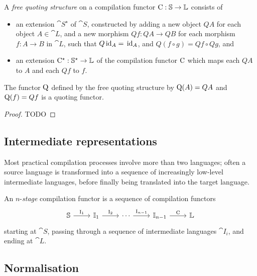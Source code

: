 \begin{definition}
  A \emph{free quoting structure} on a compilation functor $\mathrm C : \mathbb S
    \to \mathbb L$ consists of
  \begin{itemize}
    \item an extension $\cat S^\star$ of $\cat S$, constructed by adding a new object $Q
            A$ for each object $A \in \cat L$, and a new morphism $Q f : Q A \to Q B$ for
          each morphism $f : A \to B$ in $\cat L$, such that $Q \, \text{id}_A = \,
            \text{id}_A$, and $Q (f \circ g) = Q f \circ Q g$, and
    \item an extension $\mathrm C^\star : \mathbb S^\star \to \mathbb L$ of the compilation
          functor $\mathrm C$ which maps each $Q A$ to $A$ and each $Q f$ to $f$.
  \end{itemize}
\end{definition}

\begin{lemma}
  The functor $\mathrm Q$ defined by the free quoting structure
  by $\mathrm Q (A) = Q A$ and $\mathrm Q (f) = Q f$ is a quoting functor.

  \begin{proof}
    TODO
  \end{proof}
\end{lemma}

\subsection{Intermediate representations}

Most practical compilation processes involve more than two languages; often a
source language is transformed into a sequence of increasingly low-level
intermediate languages, before finally being translated into the target
language.

\begin{definition}
  An $n$-\emph{stage} compilation functor is a sequence of compilation functors
  $$
    \begin{tikzcd}
      \cat S \arrow[r, "\fun I_1"] & \cat I_1 \arrow[r, "\fun I_2"]
      & \cdots \arrow[r, "\fun I_{n-1}"] & \cat I_{n-1} \arrow[r, "\fun C"] & \cat L
    \end{tikzcd}
  $$
  starting at $\cat S$, passing through a sequence of intermediate languages
  $\cat I_i$, and ending at $\cat L$.
\end{definition}

\subsection{Normalisation}

